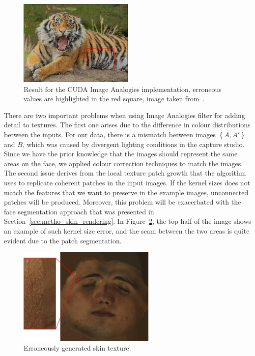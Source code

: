 \begin{figure}[htbp!]
\centering
\includegraphics[width=0.5\textwidth]{img/cuda_error}
	\caption{Result for the CUDA Image Analogies implementation, erroneous values are highlighted in the red square, image taken from~\cite{ImAnCudaWeb}.}
	\label{fig:cuda_error}
\end{figure}

There are two important problems when using Image Analogies filter for adding detail to textures.
The first one arises due to the difference in colour distributions between the inputs.
For our data, there is a mismatch between images $\left\lbrace A, A' \right\rbrace$ and $B$, which was caused by divergent lighting conditions in the capture studio.
Since we have the prior knowledge that the images should represent the same areas on the face, we applied colour correction techniques to match the images.
The second issue derives from the local texture patch growth that the algorithm uses to replicate coherent patches in the input images.
If the kernel sizes does not match the features that we want to preserve in the example images, unconnected patches will be produced.
Moreover, this problem will be exacerbated with the face segmentation approach that was presented in Section~\ref{sec:metho_skin_rendering}.
In Figure~\ref{fig:skin_patch_error}, the top half of the image shows an example of such kernel size error, and the seam between the two areas is quite evident due to the patch segmentation.

\begin{figure}[htbp!]
\centering
\includegraphics[width=0.6\textwidth]{img/skin_patch_error}
	\caption{Erroneously generated skin texture.}
	\label{fig:skin_patch_error}
\end{figure}


